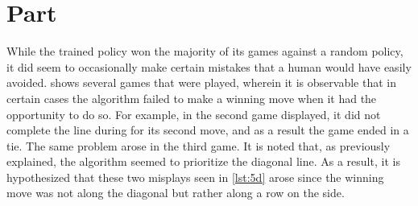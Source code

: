 \documentclass{article}
\newcommand{\enterproblemHeader}[1]{
}
\newcommand{\exitproblemHeader}[1]{
}
\newcounter{problem} %
\newcommand{\problemName}{}
\newenvironment{problem}[1][Part \theproblem]{ %
	\stepcounter{problem} %
	\renewcommand{\problemName}{#1} %
	\section{\problemName} %
	\enterproblemHeader{\problemName} %
}{
	\exitproblemHeader{\problemName} %
}
\begin{document}
\FloatBarrier
\begin{problem}
While the trained policy won the majority of its games against a random policy, it did seem to occasionally make certain mistakes that a human would have easily avoided.  shows several games that were played, wherein it is observable that in certain cases the algorithm failed to make a winning move when it had the opportunity to do so. For example, in the second game displayed, it did not complete the line during for its second move, and as a result the game ended in a tie. The same problem arose in the third game. It is noted that, as previously explained, the algorithm seemed to prioritize the diagonal line. As a result, it is hypothesized that these two misplays seen in \ref{lst:5d} arose since the winning move was not along the diagonal but rather along a row on the side.
\end{problem}
\clearpage


\end{document}
